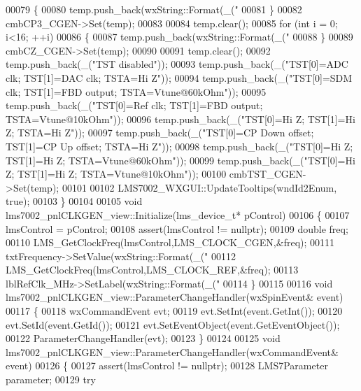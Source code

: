 \begin{DoxyCode}
{00079     \{
00080         temp.push\_back(wxString::Format(\_(\textcolor{stringliteral}{"%
00081     \}
00082     cmbCP3_CGEN->Set(temp);
00083 
00084     temp.clear();
00085     \textcolor{keywordflow}{for} (\textcolor{keywordtype}{int} i = 0; i<16; ++i)
00086     \{
00087         temp.push\_back(wxString::Format(\_(\textcolor{stringliteral}{"%
00088     \}
00089     cmbCZ_CGEN->Set(temp);
00090 
00091     temp.clear();
00092     temp.push\_back(\_(\textcolor{stringliteral}{"TST disabled"}));
00093     temp.push\_back(\_(\textcolor{stringliteral}{"TST[0]=ADC clk; TST[1]=DAC clk; TSTA=Hi Z"}));
00094     temp.push\_back(\_(\textcolor{stringliteral}{"TST[0]=SDM clk; TST[1]=FBD output; TSTA=Vtune@60kOhm"}));
00095     temp.push\_back(\_(\textcolor{stringliteral}{"TST[0]=Ref clk; TST[1]=FBD output; TSTA=Vtune@10kOhm"}));
00096     temp.push\_back(\_(\textcolor{stringliteral}{"TST[0]=Hi Z; TST[1]=Hi Z; TSTA=Hi Z"}));
00097     temp.push\_back(\_(\textcolor{stringliteral}{"TST[0]=CP Down offset; TST[1]=CP Up offset; TSTA=Hi Z"}));
00098     temp.push\_back(\_(\textcolor{stringliteral}{"TST[0]=Hi Z; TST[1]=Hi Z; TSTA=Vtune@60kOhm"}));
00099     temp.push\_back(\_(\textcolor{stringliteral}{"TST[0]=Hi Z; TST[1]=Hi Z; TSTA=Vtune@10kOhm"}));
00100     cmbTST_CGEN->Set(temp);
00101 
00102     LMS7002_WXGUI::UpdateTooltips(wndId2Enum, \textcolor{keyword}{true});
00103 \}
00104 
00105 \textcolor{keywordtype}{void} lms7002_pnlCLKGEN_view::Initialize(lms_device_t* pControl)
00106 \{
00107     lmsControl = pControl;
00108     assert(lmsControl != \textcolor{keyword}{nullptr});
00109     \textcolor{keywordtype}{double} freq;
00110     LMS_GetClockFreq(lmsControl,LMS_CLOCK_CGEN,&freq);
00111     txtFrequency->SetValue(wxString::Format(\_(\textcolor{stringliteral}{"%
00112     LMS_GetClockFreq(lmsControl,LMS_CLOCK_REF,&freq);
00113     lblRefClk_MHz->SetLabel(wxString::Format(\_(\textcolor{stringliteral}{"%
00114 \}
00115 
00116 \textcolor{keywordtype}{void} lms7002_pnlCLKGEN_view::ParameterChangeHandler(wxSpinEvent& event)
00117 \{
00118     wxCommandEvent evt;
00119     evt.SetInt(event.GetInt());
00120     evt.SetId(event.GetId());
00121     evt.SetEventObject(event.GetEventObject());
00122     ParameterChangeHandler(evt);
00123 \}
00124 
00125 \textcolor{keywordtype}{void} lms7002_pnlCLKGEN_view::ParameterChangeHandler(wxCommandEvent& event)
00126 \{
00127     assert(lmsControl != \textcolor{keyword}{nullptr});
00128     LMS7Parameter parameter;
00129     \textcolor{keywordflow}{try}
}}}}}
\end{DoxyCode}
